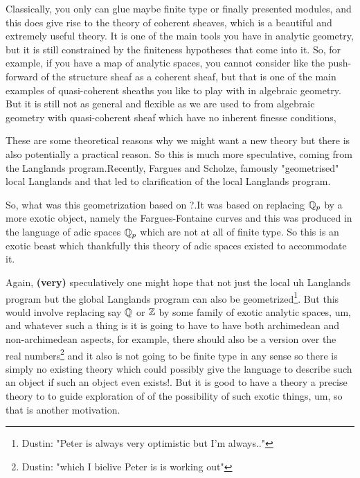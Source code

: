 \begin{remark}
    Classically, you only can glue maybe finite type or finally presented modules, and this does give rise to the theory of coherent sheaves, which is a beautiful and extremely useful theory. It is one of the main tools you have in analytic geometry, but it is still constrained by the finiteness hypotheses that come into it. So, for example, if you have a map of analytic spaces, you cannot consider like the push-forward of the structure sheaf as a coherent sheaf, but that is one of the main examples of quasi-coherent sheaths you like to play with in algebraic geometry. But it is still not as general and flexible as we are used to from algebraic geometry with quasi-coherent sheaf which have no inherent finesse conditions,
\end{remark}

These are some theoretical reasons why we might want a new theory but there is also potentially a practical reason. So this is much more speculative, coming from the Langlands program.Recently, Fargues and Scholze, famously "geometrised" local Langlands and that led to clarification of the local Langlands program.

So, what was this geometrization based on ?.It was based on replacing $\Bbb{Q}_p$ by a more exotic object, namely the Fargues-Fontaine curves and this was produced in the language of adic spaces $\Bbb{Q}_p$ which are not at all of finite type. So this is an exotic beast which thankfully this theory of adic spaces existed to accommodate it.

Again, \textbf{(very)} speculatively one might hope that not just the local uh Langlands program but the global Langlands program can also be geometrized\footnote{Dustin: "Peter is always very optimistic but I'm always.."}. But this would involve replacing say $\Bbb{Q}$ or $\Bbb{Z}$ by some family of exotic analytic spaces, um, and whatever such a thing is it is going to have to have both archimedean and non-archimedean aspects, for example, there should also be a version over the real numbers\footnote{Dustin: "which I bielive Peter is is working out"} and it also is not going to be finite type in any sense so there is simply no existing theory which could possibly give the language to describe such an object if such an object even exists!. But it is good to have a theory a precise theory to to guide exploration of of the possibility of such exotic things, um, so that is another motivation.

